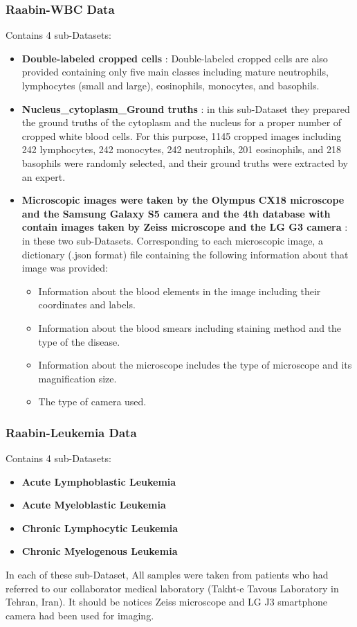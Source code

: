 \subsubsection{Raabin-WBC Data}
\hspace{\parindent}
Contains 4 sub-Datasets:
\begin{itemize}
    \item \textbf{Double-labeled cropped cells} : Double-labeled cropped cells are also provided containing only five main classes including mature neutrophils, lymphocytes (small and large), eosinophils, monocytes, and basophils. 
    \item \textbf{Nucleus\_cytoplasm\_Ground truths} : in this sub-Dataset they prepared the ground truths of the cytoplasm and the nucleus for a proper number of cropped white blood cells. For this purpose, 1145 cropped images including 242 lymphocytes, 242 monocytes, 242 neutrophils, 201 eosinophils, and 218 basophils were randomly selected, and their ground truths were extracted by an expert.
    \item \textbf{Microscopic images were taken by the Olympus CX18 microscope and the Samsung Galaxy S5 camera and the 4th database with contain images taken by Zeiss microscope and the LG G3 camera } : in these two sub-Datasets. Corresponding to each microscopic image, a dictionary (.json format) file containing the following information about that image was provided:
    \begin{itemize}
        \item Information about the blood elements in the image including their coordinates and labels.
        \item Information about the blood smears including staining method and the type of the disease.
        \item Information about the microscope includes the type of microscope and its magnification size.
        \item The type of camera used.
    \end{itemize}
\end{itemize}

\subsubsection{Raabin-Leukemia Data}
\hspace{\parindent}
Contains 4 sub-Datasets:
\begin{itemize}
    \item \textbf{Acute Lymphoblastic Leukemia}  
    \item \textbf{Acute Myeloblastic Leukemia} 
    \item \textbf{Chronic Lymphocytic Leukemia}
    \item \textbf{Chronic Myelogenous Leukemia}
\end{itemize}
In each of these sub-Dataset, All samples were taken from patients who had referred to our collaborator medical laboratory (Takht-e Tavous Laboratory in Tehran, Iran). It should be notices Zeiss microscope and LG J3 smartphone camera had been used for imaging.

